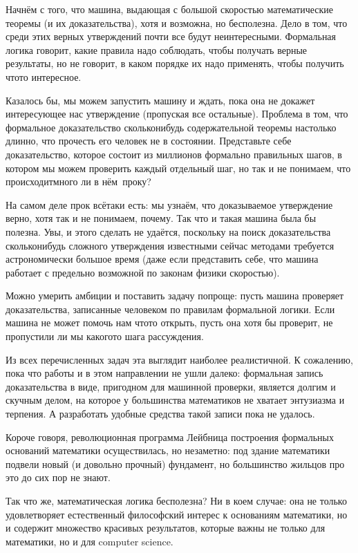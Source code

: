 Начнём с того, что машина, выдающая с большой скоростью
математические теоремы (и их доказательства), хотя и возможна,
но бесполезна. Дело в том, что среди этих верных утверждений
почти все будут неинтересными. Формальная логика говорит, какие
правила надо соблюдать, чтобы получать верные результаты, но не
говорит, в каком порядке их надо применять, чтобы получить
что\д то интересное.

Казалось бы, мы можем запустить машину и ждать, пока она не
докажет интересующее нас утверждение (пропуская все остальные).
Проблема в том, что формальное доказательство сколько\д нибудь
содержательной теоремы настолько длинно, что прочесть его
человек не в состоянии. Представьте себе доказательство, которое
состоит из миллионов формально правильных шагов, в котором мы
можем проверить каждый отдельный шаг, но так и не понимаем, что
происходит\т много ли в нём~проку?

На самом деле прок всё\д таки есть: мы узнаём, что
доказываемое утверждение верно, хотя так и не понимаем, почему.
Так что и такая машина была бы полезна. Увы, и этого сделать не
удаётся, поскольку на поиск доказательства сколько\д нибудь
сложного утверждения известными сейчас методами требуется
астрономически большое время (даже если представить себе, что
машина работает с предельно возможной по законам физики
скоростью).

Можно умерить амбиции и поставить  задачу попроще: пусть
машина проверяет доказательства, записанные человеком по
правилам формальной логики. Если машина не может помочь нам
что\д то открыть, пусть она хотя бы проверит, не пропустили ли мы
какого\д то шага рассуждения.

Из всех перечисленных задач эта выглядит наиболее реалистичной.
К сожалению, пока что работы и в этом направлении не ушли
далеко: формальная запись доказательства в виде, пригодном для
машинной проверки, является долгим и скучным делом, на которое у
большинства математиков не хватает энтузиазма и терпения. А разработать
удобные средства такой записи пока не удалось.

Короче говоря, революционная программа Лейбница построения
формальных оснований математики осуществилась, но незаметно: под
здание математики подвели новый (и довольно прочный) фундамент,
но большинство жильцов про это до сих пор не знают.

Так что же, математическая логика бесполезна? Ни в коем
случае: она не только удовлетворяет естественный философский
интерес к основаниям математики, но и содержит множество
красивых результатов, которые важны не только для математики,
но и для computer science.

